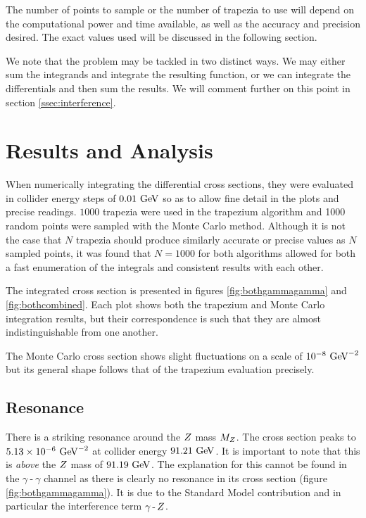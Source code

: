 \documentclass[]{article}
\providecommand{\e}[1]{\ensuremath{\times 10^{#1}}}
\begin{document}
The number of points to sample or the number of trapezia to use will depend on the computational power and time available, as well as the accuracy and precision desired. The exact values used will be discussed in the following section.

We note that the problem may be tackled in two distinct ways. We may either sum the integrands and integrate the resulting function, or we can integrate the differentials and then sum the results. We will comment further on this point in section \ref{ssec:interference}.


\section{Results and Analysis}\label{sec:results}

When numerically integrating the differential cross sections, they were evaluated in collider energy steps of $0.01\GeV$ so as to allow fine detail in the plots and precise readings. $1000$ trapezia were used in the trapezium algorithm and 1000 random points were sampled with the Monte Carlo method. Although it is not the case that $N$ trapezia should produce similarly accurate or precise values as $N$ sampled points, it was found that $N=1000$ for both algorithms allowed for both a fast enumeration of the integrals and consistent results with each other.

The integrated cross section is presented in figures \ref{fig:bothgammagamma} and \ref{fig:bothcombined}. Each plot shows both the trapezium and Monte Carlo integration results, but their correspondence is such that they are almost indistinguishable from one another.

The Monte Carlo cross section shows slight fluctuations on a scale of $10^{-8}\GeV^{-2}$ but its general shape follows that of the trapezium evaluation precisely.

\subsection{Resonance}\label{ssec:resonance}

There is a striking resonance around the $Z $ mass $M_{Z }$. The cross section peaks to $5.13\e{-6}\GeV^{-2}$ at collider energy $91.21\GeV$. It is important to note that this is \emph{above} the $Z $ mass of $91.19\GeV$. The explanation for this cannot be found in the $\gamma\operatorname{-}\gamma$ channel as there is clearly no resonance in its cross section (figure \ref{fig:bothgammagamma}). It is due to the Standard Model contribution and in particular the interference term $\gamma\operatorname{-}Z $.
\end{document}
